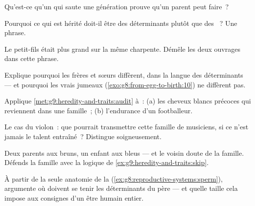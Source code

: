 \begin{exercise}[$\star$]\label{exo:g9:heredity-and-traits:5}
Qu'est-ce qu'un  qui saute une génération prouve
qu'un parent peut faire~?
\end{exercise}

\begin{exercise}[$\star$]\label{exo:g9:heredity-and-traits:6}
Pourquoi ce qui est hérité doit-il être des déterminants
plutôt que des ~? Une phrase.
\end{exercise}

\begin{exercise}[$\star\star$]\label{exo:g9:heredity-and-traits:7}
Le petit-fils était plus grand sur la même charpente.
Démêle les deux ouvrages dans cette phrase.
\end{exercise}

\begin{exercise}[$\star\star$]\label{exo:g9:heredity-and-traits:8}
Explique pourquoi les frères et sœurs diffèrent, dans la
langue des déterminants --- et pourquoi les vrais jumeaux
(\cref{exo:g8:from-egg-to-birth:10}) ne diffèrent pas.
\end{exercise}

\begin{exercise}[$\star\star$]\label{exo:g9:heredity-and-traits:9}
Applique \cref{met:g9:heredity-and-traits:audit} à~: (a)
les cheveux blancs précoces qui reviennent dans une
famille~; (b) l'endurance d'un footballeur.
\end{exercise}

\begin{exercise}[$\star\star$]\label{exo:g9:heredity-and-traits:10}
Le cas du violon~: que pourrait transmettre cette famille
de musiciens, si ce n'est jamais le talent entraîné~?
Distingue soigneusement.
\end{exercise}

\begin{exercise}[$\star\star$]\label{exo:g9:heredity-and-traits:11}
Deux parents aux  bruns, un enfant aux  bleus ---
et le voisin doute de la famille. Défends la famille avec
la logique de \cref{ex:g9:heredity-and-traits:skip}.
\end{exercise}

\begin{exercise}[$\star\star\star$]\label{exo:g9:heredity-and-traits:12}
À partir de la seule anatomie de la 
(\cref{ex:g8:reproductive-systems:sperm}), argumente où
doivent se tenir les déterminants du père --- et quelle
taille cela impose aux consignes d'un être humain entier.
\end{exercise}

